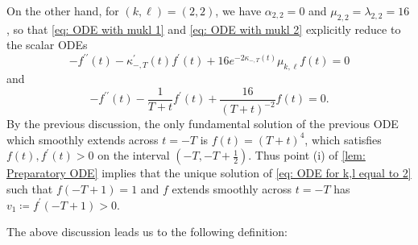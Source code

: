 \documentclass{article}
\numberwithin{equation}{section}        %
\theoremstyle{bfnote}
\theoremstyle{definition}
\theoremstyle{bfremark}
\begin{document}
On the other hand, for $(k,\ell) = (2,2)$, we have $\alpha_{2,2} = 0$ and $\mu_{2,2} = \lambda_{2,2} = 16$, so that \eqref{eq: ODE with mukl 1} and \eqref{eq: ODE with mukl 2} explicitly reduce to the scalar ODEs
\begin{equation}
    - f^{\prime\prime}(t) - \kappa^\prime_{-,T}(t) f^\prime(t) + 16 e^{-2\kappa_{-,T}(t)}\mu_{k,\ell}f(t) = 0 
\end{equation}  \label{eq: ODE for k,l equal to 2}
and
\begin{equation}
    - f^{\prime\prime}(t) - \frac{1}{T+t} f^\prime(t) + \frac{16}{(T+t)^{-2}} f(t) = 0 .
\end{equation}
By the previous discussion, the only fundamental solution of the previous ODE which smoothly extends across $t = -T$ is $f(t) = (T+t)^4$, which satisfies $f(t), f^\prime(t) > 0$ on the interval $(-T,-T+\frac{1}{2})$. Thus point (i) of \cref{lem: Preparatory ODE} implies that the unique solution of \eqref{eq: ODE for k,l equal to 2} such that $f(-T+1) = 1$ and $f$ extends smoothly across $t = -T$ has $v_1 \coloneqq f^\prime(-T+1) > 0$.

The above discussion leads us to the following definition:
\end{document}
